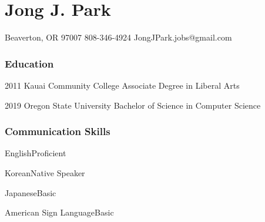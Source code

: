 \documentclass{tccv}
\begin{document}
	
\part{Jong J. Park}
	{Beaverton, OR 97007}
	{808-346-4924}
	{JongJPark.jobs@gmail.com}

\section{Education}
	\begin{yearlist}
		\item{2011}
			{Kauai Community College}
			{Associate Degree in Liberal Arts}
		\item {2019}
			{Oregon State University}
			{Bachelor of Science in Computer Science}
	\end{yearlist}

\section {Communication Skills}
	\begin{factlist}
		\item {English}{Proficient}
		\item {Korean}{Native Speaker}
		\item {Japanese}{Basic}
		\item {American Sign Language}{Basic}
	\end{factlist}

\end{document}
